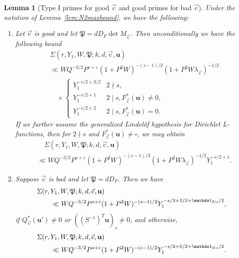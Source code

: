 \documentclass[letterpaper,11pt]{amsart}
\numberwithin{equation}{section}
\newtheorem{lemma}[theorem]{Lemma}
\theoremstyle{definition}
\numberwithin{equation}{section}
\newcommand{\uu}{\mathbf{u}}
\newcommand{\Y}{\underline{\mathbf{Y}}}
\newcommand{\uc}{{\vec{\mathrm{c}}}}
\newcommand{\ve}{\varepsilon}
\begin{document}
\begin{lemma}[Type I primes for good $\uc$ and good primes for bad $\uc$]\label{q1sum}
Under the notation of Lemma~\ref{lem:N2maxbound}, we have the following:
\begin{enumerate}
\item \label{q1sumgoodc}Let $\uc$ is good and let $\mathfrak P=dD_F\det M_\uc$. Then unconditionally we have the following bound
\begin{align}
\nonumber
&\Sigma(r, Y_1,W, \mathfrak P; k, d, \uc, \uu)\\
\nonumber
& \ll 
WQ^{-3/2} P^{s+\ve}(1+P^2W)^{-(s-1)/2}(1+P^2W\lambda_\uc)^{-1/2}
\\
\label{eq:uncond}
&\quad\times\begin{cases}
Y_1^{-s/2+3/2} & 2\nmid s,
\\
Y_1^{-s/2+1}&2\mid s, F_\uc^*(\uu)\neq 0,
\\Y_1^{-s/2+2}
& 2 \mid s,  F_\uc^*(\uu)= 0.
\end{cases} 
\end{align}
If we further assume the generalized Lindel\"of hypothesis for Dirichlet L-functions, then for $2\nmid s$ and $F_\uc^*(\uu)\not=\square$, we may obtain
\begin{align}\label{eq:condi}
&\quad\Sigma(r, Y_1,W, \mathfrak P; k, d, \uc, \uu)\\  &\ll
WQ^{-3/2} P^{s+\ve}(1+P^2W)^{-(s-1)/2}(1+P^2W\lambda_\uc)^{-1/2}
Y_1^{-s/2+1}.\nonumber
\end{align}
\item \label{q1sumbadc}Suppose $\uc$ is bad and let $\mathfrak P=dD_F$. Then
we have
\begin{align*}
\MoveEqLeft\Sigma(r, Y_1,W, \mathfrak P; k, d, \uc, \uu)\\ &\ll 
WQ^{-3/2} P^{s+\ve}(1+P^2W)^{-(s-1)/2}
Y_1^{-s/2+3/2+\mathds 1_{2\mid s}/2},
\end{align*}if $Q_\uc^*(\uu')\not =0$ or $((S^{-1})^T\uu)_s\neq 0$, 
and otherwise, 
\begin{align*}
\MoveEqLeft\Sigma(r, Y_1,W, \mathfrak P; k, d, \uc, \uu)
\\ &\ll 
WQ^{-3/2} P^{s+\ve}(1+P^2W)^{-(s-1)/2}
Y_1^{-s/2+5/2+\mathds 1_{2\mid s}/2}.
\end{align*}
\end{enumerate}
\end{lemma}
\end{document}
